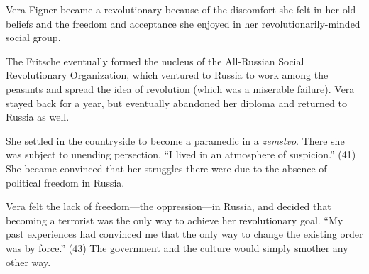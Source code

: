 \documentclass[12pt]{article}
\begin{document}
Vera Figner became a revolutionary because of the discomfort she felt in
her old beliefs and the freedom and acceptance she enjoyed in her
revolutionarily-minded social group. 

The Fritsche eventually formed the nucleus of the All-Russian Social
Revolutionary Organization, which ventured to Russia to work among the
peasants and spread the idea of revolution (which was a miserable
failure).  Vera stayed back for a year, but eventually abandoned her
diploma and returned to Russia as well.  

She settled in the countryside to become a paramedic in a
\textit{zemstvo}.  There she was subject to unending persection. ``I
lived in an atmosphere of suspicion.'' (41)  She became convinced that
her struggles there were due to the absence of political freedom in
Russia.

Vera felt the lack of freedom---the oppression---in Russia, and decided
that becoming a terrorist was the only way to achieve her revolutionary
goal. ``My past experiences had convinced me that the only way to change
the existing order was by force.'' (43)  The government and the culture
would simply smother any other way.   
\end{document}
